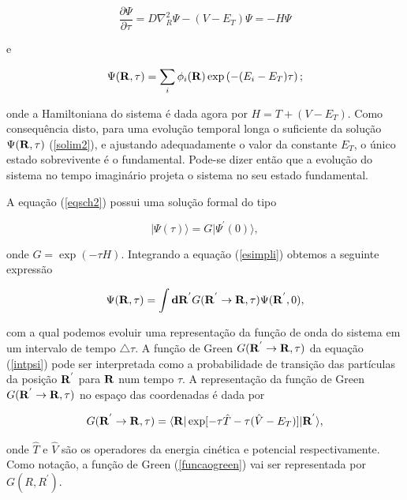 \documentclass[12pt,twoside,a4paper]{report}
\begin{document}
\begin{equation} \label{eqsch2}
\frac{\partial \Psi}{\partial \tau}= D \nabla_R^2 \Psi -
(V-E_T) \Psi = -H \Psi
\end{equation}

\noindent e

\begin{equation} \label{solim2}
\Psi({\bf R},\tau) = \sum_i \phi_i ({\bf R}) \exp  \left( -
(E_i - E_T) \tau
\right);
\end{equation}

\noindent onde a Hamiltoniana do sistema é dada agora por $H =
T+(V-E_T)$. Como
consequência disto, para uma evolução temporal longa o suficiente da
solução
$\Psi({\bf R},\tau)$
(\ref{solim2}), e ajustando adequadamente o valor da constante
$E_T$, o único estado sobrevivente é o fundamental. Pode-se
dizer então que a evolução do sistema no tempo
imaginário projeta o sistema no seu estado fundamental.

A equação (\ref{eqsch2}) possui uma solução formal do tipo

\begin{equation} \label{esimpli}
|\Psi(\tau)\rangle = G |\Psi^{'}(0)\rangle,
\end{equation}

\noindent onde $G = \exp(-\tau H)$. Integrando a equação (\ref{esimpli}) 
obtemos a
seguinte expressão

\begin{equation} \label{intpsi}
\Psi({\bf R},\tau) = \int {\bf dR}^{'} G({\bf R^{'}} \rightarrow
{\bf R}, \tau) \Psi({\bf R}^{'}, 0),
\end{equation}

\noindent com a qual podemos evoluir uma representação da função de onda do 
sistema em um
intervalo de tempo
$\triangle \tau$. A função de Green $G({\bf R}^{'}
\rightarrow {\bf R}, \tau)$ da equação (\ref{intpsi}) pode ser
interpretada
como a probabilidade de transição das partículas da
posição
${\bf R}^{'}$ para
${\bf R}$ num tempo $\tau$. A representação da função de Green
$G({\bf R}^{'}
\rightarrow {\bf R}, \tau)$ no espaço das coordenadas é dada por

\begin{equation} \label{funcaogreen}
G({\bf R}^{'} \rightarrow {\bf R}, \tau) = \langle {\bf
R}|\exp[-\tau \hat{T} -
\tau (\hat{V} - E_T)]|{\bf R}^{'} \rangle,
\end{equation}

\noindent onde $\hat{T}$ e $\hat{V}$ são os operadores da energia
cinética e
potencial respectivamente. Como notação, a
função de Green
(\ref{funcaogreen}) vai ser representada por $G(R,R^{'})$.
\end{document}
